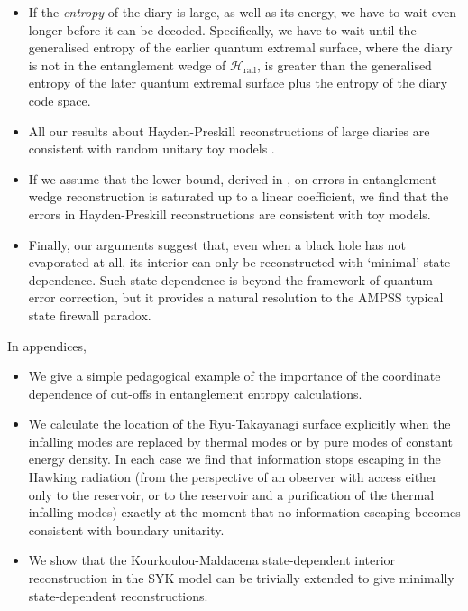 \documentclass[12pt]{article}
\begin{document}
\begin{itemize}
\item If the \emph{entropy} of the diary is large, as well as its energy, we have to wait even longer before it can be decoded. Specifically, we have to wait until the generalised entropy of the earlier quantum extremal surface, where the diary is not in the entanglement wedge of $\mathcal{H}_\text{rad}$, is greater than the generalised entropy of the later quantum extremal surface plus the entropy of the diary code space. 

\item All our results about Hayden-Preskill reconstructions of large diaries are consistent with random unitary toy models \cite{hayden2018learning}.

\item If we assume that the lower bound, derived in \cite{hayden2018learning}, on errors in entanglement wedge reconstruction is saturated up to a linear coefficient, we find that the errors in Hayden-Preskill reconstructions are consistent with toy models.

\item Finally, our arguments suggest that, even when a black hole has not evaporated at all, its interior can only be reconstructed with `minimal' state dependence. Such state dependence is beyond the framework of quantum error correction, but it provides a natural resolution to the AMPSS typical state firewall paradox.
\end{itemize}
In appendices,
\begin{itemize}
\item We give a simple pedagogical example of the importance of the coordinate dependence of cut-offs in entanglement entropy calculations.

\item We calculate the location of the Ryu-Takayanagi surface explicitly when the infalling modes are replaced by thermal modes or by pure modes of constant energy density. In each case we find that information stops escaping in the Hawking radiation (from the perspective of an observer with access either only to the reservoir, or to the reservoir and a purification of the thermal infalling modes) exactly at the moment that no information escaping becomes consistent with boundary unitarity.

\item We show that the Kourkoulou-Maldacena state-dependent interior reconstruction in the SYK model can be trivially extended to give minimally state-dependent reconstructions.
\end{itemize}
\end{document}
